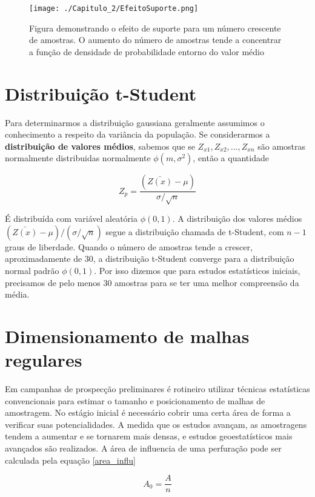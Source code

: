 \begin{figure}[H]
 	\centering
 	\texttt{[image: ./Capitulo\_2/EfeitoSuporte.png]}	
 	\caption{Figura demonstrando o efeito de suporte para um número crescente de amostras. O aumento do número de amostras tende a concentrar a  função de densidade de probabilidade entorno do valor médio }
 	\label{Efeito_Suporte}
\end{figure}

\section{Distribuição t-Student} 

Para determinarmos a distribuição gaussiana geralmente assumimos o conhecimento a respeito da variância da população. Se considerarmos a \textbf{distribuição de valores médios}, sabemos que se $Z_{x1}, Z_{x2}, ... , Z_{xn}$ são amostras normalmente distribuidas normalmente $\phi(m, \sigma^{2})$, então a quantidade 

\begin{equation}\label{padronizacao_var}
Z_{p} = \frac{(\bar{Z(x)}-\mu)}{\sigma/\sqrt{n}}
\end{equation}

É distribuída com variável aleatória $\phi(0,1)$. A distribuição dos valores médios $(\bar{Z(x)}-\mu)/(\sigma/\sqrt{n})$ segue a distribuição chamada de t-Student, com $n-1$ graus de liberdade. Quando o número de amostras tende a crescer, aproximadamente de 30, a distribuição t-Student converge para a distribuição normal padrão $\phi(0,1)$. Por isso dizemos que para estudos estatísticos iniciais, precisamos de pelo menos 30 amostras para se ter uma melhor compreensão da média. 

\section{Dimensionamento de malhas regulares} 

Em campanhas de prospecção preliminares é rotineiro utilizar técnicas estatísticas convencionais para estimar o tamanho e posicionamento de malhas de amostragem. No estágio inicial é necessário cobrir uma certa área de forma a verificar suas potencialidades. A medida que os estudos avançam, as amostragens tendem a aumentar e se tornarem mais densas, e estudos geoestatísticos mais avançados são realizados. A área de influencia de uma perfuração pode ser calculada pela equação \eqref{area_influ}

\begin{equation}\label{area_influ}
A_{0} = \frac{A}{n}
\end{equation}

